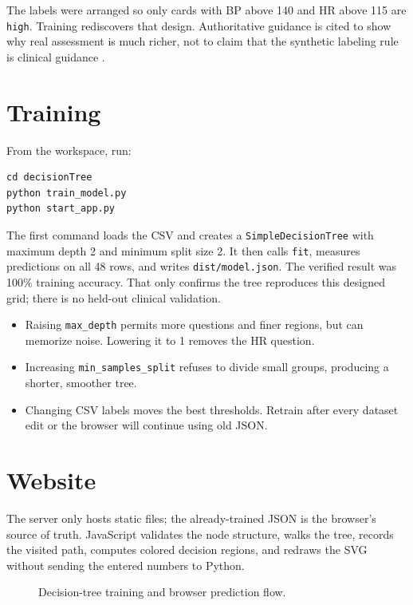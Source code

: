 \documentclass[12pt,a4paper,openany]{report}
\newcommand{\sourcepath}[1]{\texttt{#1}}
\begin{document}
The labels were arranged so only cards with BP above 140 and HR above 115 are
\texttt{high}. Training rediscovers that design. Authoritative guidance is
cited to show why real assessment is much richer, not to claim that the
synthetic labeling rule is clinical guidance \cite{accChestPain,nhlbiDiagnosis}.

\section{Training}
From the workspace, run:
\begin{lstlisting}[style=terminal]
cd decisionTree
python train_model.py
python start_app.py
\end{lstlisting}
The first command loads the CSV and creates a \texttt{SimpleDecisionTree} with
maximum depth 2 and minimum split size 2. It then calls
\texttt{fit}, measures predictions on all 48 rows, and writes
\sourcepath{dist/model.json}. The verified result was 100\% training accuracy.
That only confirms the tree reproduces this designed grid; there is no held-out
clinical validation.

\begin{itemize}
  \item Raising \texttt{max\_depth} permits more questions and finer regions,
  but can memorize noise. Lowering it to 1 removes the HR question.
  \item Increasing \texttt{min\_samples\_split} refuses to divide small groups,
  producing a shorter, smoother tree.
  \item Changing CSV labels moves the best thresholds. Retrain after every
  dataset edit or the browser will continue using old JSON.
\end{itemize}

\section{Website}
The server only hosts static files; the already-trained JSON is the browser's
source of truth. JavaScript validates the node structure, walks the tree,
records the visited path, computes colored decision regions, and redraws the
SVG without sending the entered numbers to Python.

\begin{figure}[H]
\centering
{}
\caption{Decision-tree training and browser prediction flow.}
\end{figure}
\end{document}
